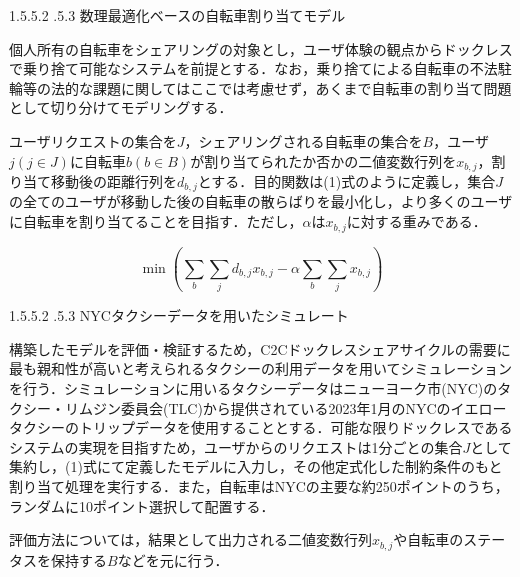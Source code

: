 \documentclass[a4paper,10pt]{jarticle}
\makeatletter
\renewcommand{\section}{\@startsection{section}{1}{\z@}%
   {1.5\Cvs \@plus.5\Cvs \@minus.2\Cvs}%
   {.5\Cvs \@plus.3\Cvs}%
   {\reset@font\large\bfseries}}   %
\makeatother
\begin{document}
\vspace{-5mm}

\section{数理最適化ベースの自転車割り当てモデル}
\vspace{-3mm}
\par 個人所有の自転車をシェアリングの対象とし，ユーザ体験の観点からドックレスで乗り捨て可能なシステムを前提とする．なお，乗り捨てによる自転車の不法駐輪等の法的な課題に関してはここでは考慮せず，あくまで自転車の割り当て問題として切り分けてモデリングする．
\par ユーザリクエストの集合を$J$，シェアリングされる自転車の集合を$B$，ユーザ$j(j \in J)$に自転車$b(b \in B)$が割り当てられたか否かの二値変数行列を$x_{b,j}$，割り当て移動後の距離行列を$d_{b,j}$とする．目的関数は(1)式のように定義し，集合$J$の全てのユーザが移動した後の自転車の散らばりを最小化し，より多くのユーザに自転車を割り当てることを目指す．ただし，$\alpha$は$x_{b,j}$に対する重みである．

\vspace{-8mm}

\begin{flushright}
\begin{equation}
\min \left( \sum_{b}\sum_{j}d_{b,j}x_{b,j} - \alpha\sum_{b}\sum_{j}x_{b,j} \right) \tag{1}
\end{equation}
\end{flushright}

\vspace{-5mm}

\section{NYCタクシーデータを用いたシミュレート}
\vspace{-3mm}
\par 構築したモデルを評価・検証するため，C2Cドックレスシェアサイクルの需要に最も親和性が高いと考えられるタクシーの利用データを用いてシミュレーションを行う．シミュレーションに用いるタクシーデータはニューヨーク市(NYC)のタクシー・リムジン委員会(TLC)から提供されている2023年1月のNYCのイエロータクシーのトリップデータを使用することとする．可能な限りドックレスであるシステムの実現を目指すため，ユーザからのリクエストは1分ごとの集合$J$として集約し，(1)式にて定義したモデルに入力し，その他定式化した制約条件のもと割り当て処理を実行する．また，自転車はNYCの主要な約250ポイントのうち，ランダムに10ポイント選択して配置する．
\par 評価方法については，結果として出力される二値変数行列$x_{b,j}$や自転車のステータスを保持する$B$などを元に行う．
\end{document}
